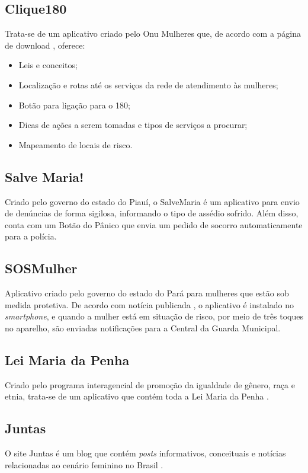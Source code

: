 \vfill

\subsection*{Clique180}
Trata-se de um aplicativo criado pelo Onu Mulheres que, de acordo com
a página de download \cite{clique_180}, oferece:

\begin{itemize}
	\item Leis e conceitos;
	\item Localização e rotas até os serviços da rede de atendimento às mulheres;
	\item Botão para ligação para o 180;
	\item Dicas de ações a serem tomadas e tipos de serviços a procurar; 
	\item Mapeamento de locais de risco.
\end{itemize}

\subsection*{Salve Maria!}
Criado pelo governo do estado do Piauí, o SalveMaria \cite{salvemaria} é um aplicativo para envio de denúncias
de forma sigilosa, informando o tipo de assédio sofrido.
Além disso, conta com um Botão do Pânico que envia um pedido de socorro automaticamente para a polícia.

\subsection*{SOSMulher}
Aplicativo criado pelo governo do estado do Pará para mulheres que estão sob medida protetiva. 
De acordo com notícia publicada \cite{sosmulher}, 
o aplicativo é instalado no \textit{smartphone}, e quando a mulher está em situação de risco, por meio de três toques no aparelho, são enviadas notificações para a Central da Guarda Municipal.

\subsection*{Lei Maria da Penha}
Criado pelo programa interagencial de promoção da igualdade de gênero, raça e etnia, trata-se de um
aplicativo que contém toda a Lei Maria da Penha \cite{leimariadapenha}.

\subsection*{Juntas}
O site Juntas é um blog que contém \textit{posts} informativos, conceituais e notícias 
relacionadas ao cenário feminino no Brasil \cite{juntas}.

